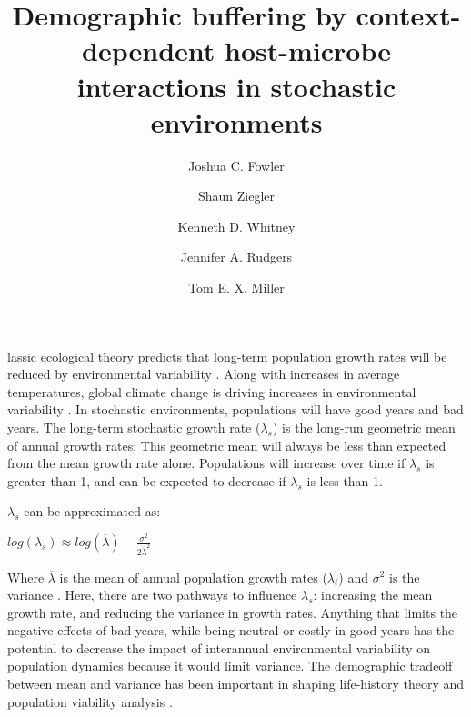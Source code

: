 \documentclass[9pt,twocolumn,twoside,lineno]{pnas-new}
\title{Demographic buffering by context-dependent host-microbe interactions in stochastic environments}
\author[a,1]{Joshua C. Fowler}
\author[b]{Shaun Ziegler}
\author[b]{Kenneth D. Whitney}
\author[b]{Jennifer A. Rudgers}
\author[a]{Tom E. X. Miller}
\affil[a]{Rice University, Department of BioSciences, Houston, TX, 77005}
\affil[b]{University of New Mexico, Department of Biology, Albuquerque, NM, 87131}
\begin{document}


\maketitle
\thispagestyle{firststyle}


lassic ecological theory predicts that long-term population growth rates will be reduced by environmental variability \cite{lewontin_population_1969,tuljapurkar_population_1982}. Along with increases in average temperatures, global climate change is driving increases in environmental variability \cite{IPCC2012managing, seneviratne2012changes, stocker2013technical}. In stochastic environments, populations will have good years and bad years. The long-term stochastic growth rate ($\lambda_s$) is the long-run geometric mean of annual growth rates; This geometric mean will always be less than expected from the mean growth rate alone. Populations will increase over time if $\lambda_s$ is greater than 1, and can be expected to decrease if $\lambda_s$ is less than 1. 

$\lambda_s$ can be approximated as: 

 $log(\lambda_s)  \approx log(\overline{\lambda}) - \frac{\sigma^2}{2\overline{\lambda}^2}$ 

Where $\overline{\lambda} $ is the mean of annual population growth rates ($\lambda_t$) and $\sigma^2$ is the variance \citep{lewontin_population_1969}. Here, there are two pathways to influence $\lambda_s$: increasing the mean growth rate, and reducing the variance in growth rates. Anything that limits the negative effects of bad years, while being neutral or costly in good years has the potential to decrease the impact of interannual environmental variability on population dynamics because it would limit variance. The demographic tradeoff between mean and variance has been important in shaping life-history theory  \cite{pfister1998patterns} and population viability analysis \cite{menges1990population}. 
\end{document}
